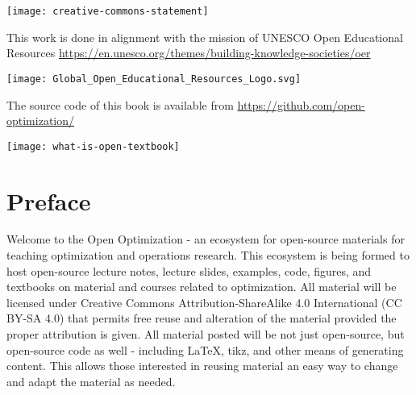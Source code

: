\documentclass[../open-optimization/open-optimization.tex]{subfiles}
\begin{document}

\maketitle
\texttt{[image: creative-commons-statement]}


This work is done in alignment with the mission of UNESCO Open Educational Resources \url{https://en.unesco.org/themes/building-knowledge-societies/oer}
\begin{center}
\texttt{[image: Global\_Open\_Educational\_Resources\_Logo.svg]}\footnotemark
\end{center}

The source code of this book is available from
\url{https://github.com/open-optimization/}

\newpage

\texttt{[image: what-is-open-textbook]}\footnotemark
{}

\newpage

\section*{Preface}

Welcome to the Open Optimization - an ecosystem for open-source materials for teaching optimization and operations research.  This ecosystem is being formed to host open-source lecture notes, lecture slides, examples, code, figures, and textbooks on material and courses related to optimization.  All material will be licensed under Creative Commons Attribution-ShareAlike 4.0 International (CC BY-SA 4.0) that permits free reuse and alteration of the material provided the proper attribution is given.  All material posted will be not just open-source, but open-source code as well - including LaTeX, tikz, and other means of generating content.  This allows those interested in reusing material an easy way to change and adapt the material as needed.
\end{document}
